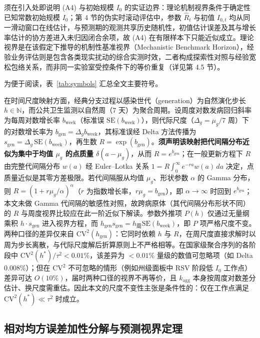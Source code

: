 \documentclass[10pt,a4paper]{article}
\theoremstyle{plain}
\theoremstyle{definition}
\begin{document}
须在引入处即说明 (A4) 与初始规模 $I_0$ 的实证边界：理论机制视界条件于确定性已知常数初始规模 $I_0$；第 4 节的伪实时滚动评估中，参数 $\hat{R}_t$ 与初值 $I_{0,t}$ 均从同一滑动窗口在线估计，与预测期的观测共享历史随机性，初值估计误差及其与增长率估计的协方差进入未归因闭合余项，故 (A4) 在有限样本下只能近似成立。理论视界是在该假定下推导的机制性基准视界（Mechanistic Benchmark Horizon），经验业务评估则是包含各类现实扰动的综合实测时效，二者构成探索性对照与经验宽松包络关系，而非同一实验室受控条件下的等价重复（详见第 4.5 节）。

为便于阅读，表~\ref{tab:symbols} 汇总全文主要符号。



在时间尺度映射方面，经典分支过程以感染世代（generation）为自然演化步长 $h \in \mathbb{N}$，而公共卫生监测以自然周（7 天）为聚合周期。设周度对数发病回归斜率为每周对数增长率 $b_{\text{week}}$（标准误 $\text{SE}(b_{\text{week}})$），则代际尺度（$\Delta_g = \mu_g/7$ 周）下的对数增长率为 $b_{\text{gen}} = \Delta_g b_{\text{week}}$，其标准误经 Delta 方法传播为 $s_{\text{gen}} = \Delta_g\,\text{SE}(b_{\text{week}})$，再生数 $R = \exp(b_{\text{gen}})$。\textbf{须声明该映射把代间隔分布近似为集中于均值 $\mu_g$ 的点质量 $\delta(a-\mu_g)$}，从而 $R = e^{b_{\text{gen}}}$；在一般更新方程下 $R$ 由完整代间隔分布 $w(a)$ 经 Euler--Lotka 关系 $1 = R\int_0^\infty e^{-ra}w(a)\,da$ 决定，点质量近似是其零方差极限。若代间隔服从均值 $\mu_g$、形状参数 $\alpha$ 的 Gamma 分布，则 $R = \left(1 + r\mu_g/\alpha\right)^{\alpha}$（$r$ 为指数增长率，$r\mu_g = b_{\text{gen}}$），即 $\alpha \to \infty$ 时回到 $e^{b_{\text{gen}}}$；本文未做 Gamma 代间隔的敏感性对照，故跨病原体（其代间隔分布形状不同）的 $R$ 与周度视界比较应在此一阶近似下解读。参数外推项 $P(h)$ 仅通过无量纲乘积 $h \cdot s_{\text{gen}}$ 进入视界方程，而 $h_{\text{gen}} s_{\text{gen}} = h_{\text{周}} \text{SE}(b_{\text{week}})$，即 $P$ 项严格尺度不变。两种口径的差异仅来自 $\text{CV}^2(h_{\text{gen}})$：它同时依赖 $h$ 与 $R$，在周尺度直接求解时以周为步长离散，与代际尺度解后折算原则上不严格相等。在国家级聚合序列的各阶段中 $\text{CV}^2(h^*)/\tau^2 < 0.01\%$，该差异为 $<0.01\%$ 量级的数值可忽略项（如 Delta 0.008\%）；但在 $\text{CV}^2$ 不可忽略的情形（例如州级面板中 RSV 阶段低 $I_0$ 工作点）差异可达 $O(10\%)$，届时两种口径的视界不再等价，且 $k_{\text{agg}}$ 本身按周度对数差分估计、换尺度需重估。因此本文的尺度不变性主张是条件性的：仅在工作点满足 $\text{CV}^2(h^*) \ll \tau^2$ 时成立。

\subsection{相对均方误差加性分解与预测视界定理}
\end{document}
